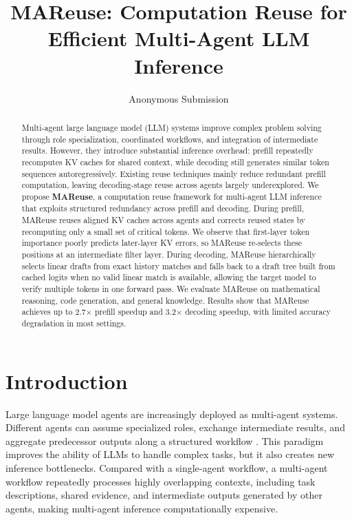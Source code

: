 \documentclass[letterpaper]{article} %
\title{MAReuse: Computation Reuse for Efficient Multi-Agent LLM Inference}
\author{Anonymous Submission}
\begin{document}
\maketitle

\begin{abstract}
Multi-agent large language model (LLM) systems improve complex problem solving through role specialization, coordinated workflows, and integration of intermediate results. However, they introduce substantial inference overhead: prefill repeatedly recomputes KV caches for shared context, while decoding still generates similar token sequences autoregressively. Existing reuse techniques mainly reduce redundant prefill computation, leaving decoding-stage reuse across agents largely underexplored. We propose \textbf{MAReuse}, a computation reuse framework for multi-agent LLM inference that exploits structured redundancy across prefill and decoding. During prefill, MAReuse reuses aligned KV caches across agents and corrects reused states by recomputing only a small set of critical tokens. We observe that first-layer token importance poorly predicts later-layer KV errors, so MAReuse re-selects these positions at an intermediate filter layer. During decoding, MAReuse hierarchically selects linear drafts from exact history matches and falls back to a draft tree built from cached logits when no valid linear match is available, allowing the target model to verify multiple tokens in one forward pass. We evaluate MAReuse on mathematical reasoning, code generation, and general knowledge. Results show that MAReuse achieves up to 2.7$\times$ prefill speedup and 3.2$\times$ decoding speedup, with limited accuracy degradation in most settings.
\end{abstract}

\section{Introduction}

Large language model agents are increasingly deployed as multi-agent systems. Different agents can assume specialized roles, exchange intermediate results, and aggregate predecessor outputs along a structured workflow \citep{li2023camel, zhang2025agentprune}. This paradigm improves the ability of LLMs to handle complex tasks, but it also creates new inference bottlenecks. Compared with a single-agent workflow, a multi-agent workflow repeatedly processes highly overlapping contexts, including task descriptions, shared evidence, and intermediate outputs generated by other agents, making multi-agent inference computationally expensive.
\end{document}
